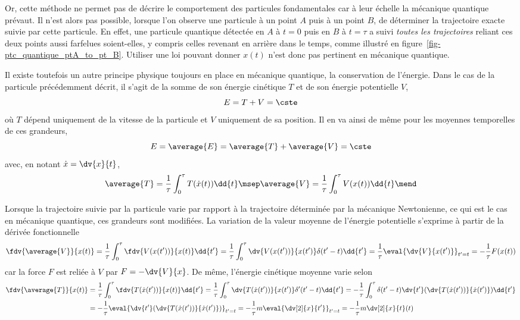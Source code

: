\par
Or, cette méthode ne permet pas de décrire le comportement des particules fondamentales
car à leur échelle la mécanique quantique prévaut.
Il n'est alors pas possible, lorsque l'on observe une particule à un point $A$ puis à un point $B$, de déterminer la trajectoire exacte suivie par cette particule.
En effet,
une particule quantique détectée
en $A$ à $t=0$ puis en $B$ à $t=\tau$
a suivi \emph{toutes les trajectoires} reliant ces deux points
aussi farfelues soient-elles,
y compris celles revenant en arrière dans le temps,
comme illustré en figure~\ref{fig-ptc_quantique_ptA_to_pt_B}.
Utiliser une loi pouvant donner $x(t)$ n'est donc pas pertinent en mécanique quantique.
\par
Il existe toutefois un autre principe physique toujours en place en mécanique quantique, la conservation de l'énergie.
Dans le cas de la particule précédemment décrit, il s'agit de la somme de son énergie cinétique $T$ et de son énergie potentielle $V$, \ie
\begin{equation}
E = T + V = \cste
\end{equation}
où $T$ dépend uniquement de la vitesse de la particule et $V$ uniquement de sa position. %
Il en va ainsi de même pour les moyennes temporelles de ces grandeurs,
\begin{equation}
E = \average{E} = \average{T} + \average{V} = \cste
\end{equation}
avec, en notant $\dot{x}=\dv{x}{t}$,
\begin{equation}
\average{T} = \frac{1}{\tau}\int_0^\tau T(\dot{x}(t)) \dd{t}
\msep
\average{V} = \frac{1}{\tau}\int_0^\tau V(x(t)) \dd{t}
\mend
\end{equation}
\par
Lorsque la trajectoire suivie par la particule varie par rapport à la trajectoire déterminée par la mécanique Newtonienne, ce qui est le cas en mécanique quantique, ces grandeurs sont modifiées.
La variation de la valeur moyenne de l'énergie potentielle s'exprime à partir de la dérivée fonctionnelle
\begin{equation}
\fdv{\average{V}}{x(t)}
= \frac{1}{\tau}\int_0^\tau \fdv{V(x(t'))}{x(t)} \dd{t'}
= \frac{1}{\tau}\int_0^\tau \dv{V(x(t'))}{x(t')}\delta(t'-t) \dd{t'}
= \frac{1}{\tau}\eval{\dv{V}{x(t')}}_{t'=t}
= -\frac{1}{\tau}F(x(t))
\end{equation}
car la force $F$ est reliée à $V$ par $F = - \dv{V}{x}$.
De même, l'énergie cinétique moyenne varie selon
\begin{align}
\fdv{\average{T}}{x(t)}
&
= \frac{1}{\tau}\int_0^\tau \fdv{T(\dot{x}(t'))}{x(t)} \dd{t'}
=\frac{1}{\tau}\int_0^\tau \dv{T(\dot{x}(t'))}{x(t')}\delta'(t'-t) \dd{t'}
=-\frac{1}{\tau}\int_0^\tau \delta(t'-t) \dv{t'}(\dv{T(\dot{x}(t'))}{\dot{x}(t')}) \dd{t'}
\nonumber
\\&
=-\frac{1}{\tau}\eval{\dv{t'}(\dv{T(\dot{x}(t'))}{\dot{x}(t')})}_{t'=t}
=-\frac{1}{\tau}m\eval{\dv[2]{x}{{t'}}}_{t'=t}
=-\frac{1}{\tau}m{\dv[2]{x}{t}}(t)
\end{align}
